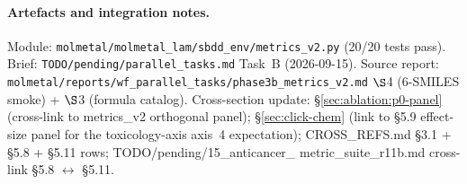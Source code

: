 \paragraph{Artefacts and integration notes.}
Module: \texttt{molmetal/molmetal\_lam/sbdd\_env/metrics\_v2.py}
(20/20 tests pass).  Brief:
\texttt{TODO/pending/parallel\_tasks.md} Task~B (2026-09-15).
Source report:
\texttt{molmetal/reports/wf\_parallel\_tasks/phase3b\_metrics\_v2.md}
$\S$4 (6-SMILES smoke) + $\S$3 (formula catalog).
Cross-section update:
\S\ref{sec:ablation:p0-panel} (cross-link to
metrics\_v2 orthogonal panel);
\S\ref{sec:click-chem} (link to §5.9 effect-size panel for
the toxicology-axis axis~4 expectation); CROSS\_REFS.md
§3.1 + §5.8 + §5.11 rows; TODO/pending/15\_anticancer\_
metric\_suite\_r11b.md cross-link §5.8 $\leftrightarrow$
§5.11.
